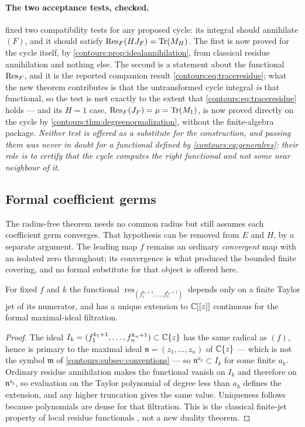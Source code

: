 \documentclass[11pt,letterpaper]{article}
\theoremstyle{definition}
\theoremstyle{remark}
\newcommand{\m}{\mathfrak m}\newcommand{\st}{\operatorname{st}}
\newcommand{\res}{\operatorname{res}}\newcommand{\wind}{\operatorname{wind}}
\numberwithin{equation}{section}
\begin{document}
\paragraph{The two acceptance tests, checked.}
 fixed two compatibility tests for any proposed
cycle: its integral should annihilate $(F)$, and it should satisfy
$\operatorname{Res}_F(HJ_F)=\operatorname{Tr}(M_H)$. The first is now proved for the cycle itself, by
\cref{contours:prop:idealannihilation}, from classical residue annihilation and
nothing else. The second is a statement about the functional $\operatorname{Res}_F$, and it is
the reported companion result \eqref{contours:eq:traceresidue}; what the new
theorem contributes is that the untransformed cycle integral \emph{is} that
functional, so the test is met exactly to the extent that
\eqref{contours:eq:traceresidue} holds --- and its $H=1$ case,
$\operatorname{Res}_F(J_F)=\mu=\operatorname{Tr}(M_1)$, is now proved directly on the cycle by
\cref{contours:thm:degreenormalization}, without the finite-algebra package.
\emph{Neither test is offered as a substitute for the construction, and passing
them was never in doubt for a functional defined by
\eqref{contours:eq:generalres}; their role is to certify that the cycle computes
the right functional and not some near neighbour of it.}

\subsection{Formal coefficient germs}
\label{contours:subsec:formalcoeff}
The radius-free theorem needs no common radius but still assumes each coefficient
germ converges. That hypothesis can be removed from $E$ and $H$, by a separate
argument. The leading map $f$ remains an ordinary \emph{convergent} map with an
isolated zero throughout; its convergence is what produced the bounded finite
covering, and no formal substitute for that object is offered here.

\begin{lemma}
\label{contours:lem:finitejet}
For fixed $f$ and $k$ the functional
$\res_{(f_1^{k_1+1},\ldots,f_n^{k_n+1})}$ depends only on a finite Taylor jet of
its numerator, and has a unique extension to $\mathbb C[[z]]$ continuous for the formal
maximal-ideal filtration.
\end{lemma}
\begin{proof}
The ideal $I_k=(f_1^{k_1+1},\ldots,f_n^{k_n+1})\subset\mathbb C\{z\}$ has the same
radical as $(f)$, hence is primary to the maximal ideal
$\mathfrak n=(z_1,\ldots,z_n)$ of $\mathbb C\{z\}$ --- which is not the symbol $\m$ of
\cref{contours:subsec:conventions} --- so $\mathfrak n^{a_k}\subset I_k$ for some
finite $a_k$. Ordinary residue annihilation makes the functional vanish on $I_k$
and therefore on $\mathfrak n^{a_k}$, so
evaluation on the Taylor polynomial of degree less than $a_k$ defines the
extension, and any higher truncation gives the same value. Uniqueness follows
because polynomials are dense for that filtration. This is the classical
finite-jet property of local residue functionals
\cite{GriffithsHarris,TajimaNabeshima}, not a new duality theorem.
\end{proof}
\end{document}
